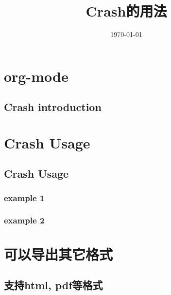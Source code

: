 \documentclass[11pt]{article}
\title{\textbf{Crash的用法}}
\author{}
\date{\today}
\begin{document}
\maketitle

\setcounter{tocdepth}{3}
\tableofcontents
\vspace*{1cm}
\section{org-mode}
\label{sec-1}
\subsection{Crash introduction}
\label{sec-1-1}
\section{Crash Usage}
\label{sec-2}
\subsection{Crash Usage}
\label{sec-2-1}
\subsubsection{example 1}
\label{sec-2-1-1}
\subsubsection{example 2}
\label{sec-2-1-2}
\section{可以导出其它格式}
\label{sec-3}
\subsection{支持html, pdf等格式}
\label{sec-3-1}
\end{document}

